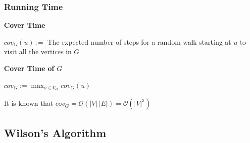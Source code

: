 \documentclass{beamer}
\begin{document}
\begin{frame}

\pause
\frametitle{Running Time}

\textbf{Cover Time}

$cov_G(u) := $ The expected number of steps for a random walk starting at $u$ to visit all the vertices in $G$

\leavevmode\hphantom{ }

\pause
\textbf{Cover Time of $G$} 

$cov_G := \max_{u \in V_G} cov_G(u)$ 

 \leavevmode\hphantom{ }
 
 \pause
 It is known that $cov_G = \mathcal{O}(|V|\ |E|) = \mathcal{O}(|V|^3)$

 


\end{frame}

\subsection{Wilson's Algorithm}
\end{document}
